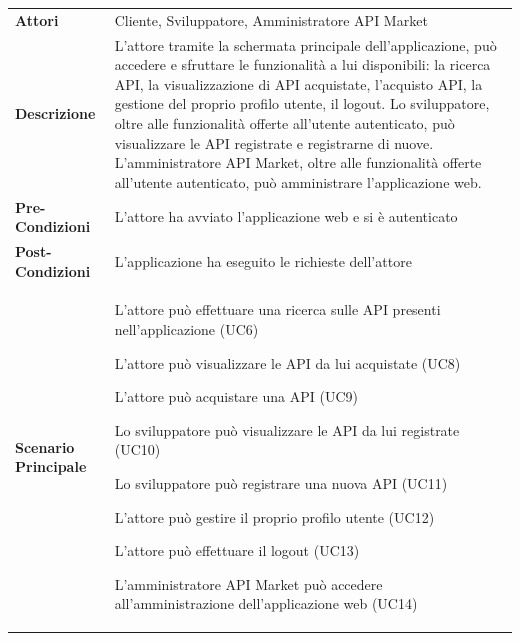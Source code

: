 \begin{longtable}{ l | p{11cm}}
	\hline
	\rowcolor{Gray}
	 \multicolumn{2}{c}{UC2 - Main post-autenticazione} \\
	 \hline
	\textbf{Attori} & Cliente, Sviluppatore, Amministratore API Market \\
	\textbf{Descrizione} & L'attore tramite la schermata principale
	dell'applicazione, può accedere e sfruttare le funzionalità a lui disponibili: la ricerca API, la visualizzazione di API acquistate, l'acquisto API, la gestione del proprio profilo utente, il logout.
	Lo sviluppatore, oltre alle funzionalità offerte all'utente autenticato, può visualizzare le API registrate e registrarne di nuove.
	L'amministratore API Market, oltre alle funzionalità offerte all'utente autenticato, può amministrare l'applicazione web. \\
	\textbf{Pre-Condizioni} & L'attore ha avviato l'applicazione web e si è autenticato \\
	\textbf{Post-Condizioni} & L'applicazione ha eseguito le richieste dell'attore \\
	\textbf{Scenario Principale} & 
	\begin{enumerate*}[label=(\arabic*.),itemjoin={\newline}]
		\item L'attore può effettuare una ricerca sulle API presenti nell'applicazione
(UC6)
		\item L'attore può visualizzare le API da lui acquistate (UC8)
		\item L'attore può acquistare una API (UC9)
		\item Lo sviluppatore può visualizzare le API da lui registrate (UC10)
		\item Lo sviluppatore può registrare una nuova API (UC11)
		\item L'attore può gestire il proprio profilo utente (UC12)
		\item L'attore può effettuare il logout (UC13)
		\item L'amministratore API Market può accedere all'amministrazione dell'applicazione web (UC14)
	\end{enumerate*}\\
\end{longtable}